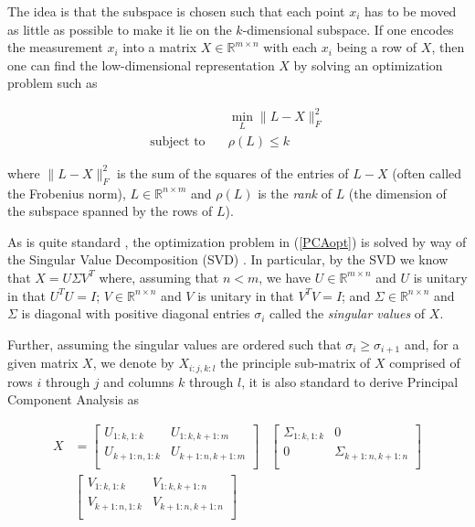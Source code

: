 \documentclass[conference]{IEEEtran}
\begin{document}
The idea is that the subspace is chosen such that each point $x_i$ has to be moved as little as possible
to make it lie on the $k$-dimensional subspace.  If one encodes the measurement $x_i$ into a matrix
$X \in \mathbb{R}^{m \times n}$ with each $x_i$ being a row of $X$, then one can find
the low-dimensional representation $X$ by solving an optimization problem such as 

\begin{align} \label{PCAopt}
  &\min_{L} \| L-X \|_F^2 \\ \nonumber
  \text{subject to}\quad & \rho(L) \le k
\end{align}

\noindent where $\| L-X \|_F^2$ is the sum of the squares of the entries of $L-X$ (often called the Frobenius norm), $L \in \mathbb{R}^{n \times m}$ and $\rho(L)$ is the \emph{rank} of $L$ (the dimension of the subspace spanned by the rows of $L$).

As is quite standard \cite{HastieTrevorTibshiraniRobertFriedman2009}, the optimization problem in (\ref{PCAopt}) is solved by way of the Singular Value Decomposition (SVD) \cite{Eckart1936}.  In particular, by the SVD we know that $X=U \Sigma V^T$ where, assuming that $n<m$, we have $U \in \mathbb{R}^{m \times n}$ and $U$ is unitary in that $U^T U = I$; $V \in \mathbb{R}^{n \times n}$ and $V$ is unitary in that $V^T V = I$; and $\Sigma \in \mathbb{R}^{n \times n}$ and $\Sigma$ is diagonal with positive diagonal entries $\sigma_i$ called the \emph{singular values} of $X$.

Further, assuming the singular values are ordered such that $\sigma_i \ge \sigma_{i+1}$
and, for a given matrix $X$, we denote by $X_{i:j,k:l}$ the principle sub-matrix of $X$ comprised of rows $i$ through $j$ and columns $k$ through $l$, it is also standard \cite{HastieTrevorTibshiraniRobertFriedman2009} to derive Principal Component Analysis as 

\begin{align*}
X 
& = 
\begin{bmatrix}
U_{1:k,1:k} & U_{1:k,k+1:m} \\
U_{k+1:n,1:k} & U_{k+1:n,k+1:m} \\
\end{bmatrix}
&
\begin{bmatrix}
\Sigma_{1:k,1:k} & 0 \\
0 & \Sigma_{k+1:n,k+1:n} \\
\end{bmatrix} \\
&
\begin{bmatrix}
V_{1:k,1:k} & V_{1:k,k+1:n} \\
V_{k+1:n,1:k} & V_{k+1:n,k+1:n} \\
\end{bmatrix} \\
\end{align*}
\end{document}
